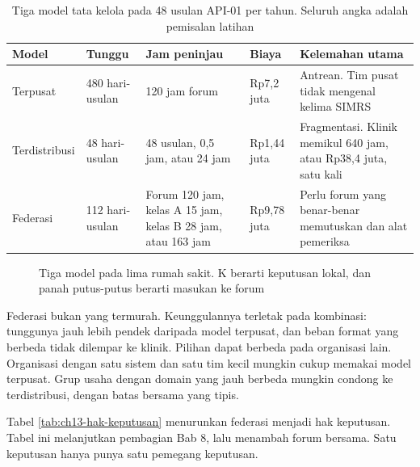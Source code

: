 \begin{table}[!htb]
  \centering
  \caption{Tiga model tata kelola pada 48 usulan API-01 per tahun. Seluruh angka adalah pemisalan latihan}
  \label{tab:ch13-tiga-model}
  \footnotesize
  \begin{tabularx}{\textwidth}{H{2.0cm}H{1.6cm}H{2.5cm}H{1.5cm}G}
    \hline
    \textbf{Model} & \textbf{Tunggu} & \textbf{Jam peninjau} & \textbf{Biaya} & \textbf{Kelemahan utama} \\ \hline
    Terpusat & 480 hari-usulan & 120 jam forum & Rp7,2 juta & Antrean. Tim pusat tidak mengenal kelima SIMRS \\ \hline
    Terdistribusi & 48 hari-usulan & 48 usulan, 0,5 jam, atau 24 jam & Rp1,44 juta & Fragmentasi. Klinik memikul 640 jam, atau Rp38,4 juta, satu kali \\ \hline
    Federasi & 112 hari-usulan & Forum 120 jam, kelas A 15 jam, kelas B 28 jam, atau 163 jam & Rp9,78 juta & Perlu forum yang benar-benar memutuskan dan alat pemeriksa \\ \hline
  \end{tabularx}
\end{table}

\begin{figure}[!htb]
  \centering
  \resizebox{\textwidth}{!}{}
  \caption{Tiga model pada lima rumah sakit. K berarti keputusan lokal, dan panah putus-putus berarti masukan ke forum}
  \label{fig:ch13-model-federasi}
\end{figure}

Federasi bukan yang termurah. Keunggulannya terletak pada kombinasi: tunggunya jauh lebih pendek daripada model terpusat, dan beban format
yang berbeda tidak dilempar ke klinik. Pilihan dapat berbeda pada organisasi lain. Organisasi dengan satu sistem dan satu tim kecil mungkin
cukup memakai model terpusat. Grup usaha dengan domain yang jauh berbeda mungkin condong ke terdistribusi, dengan batas bersama yang tipis.

Tabel \ref{tab:ch13-hak-keputusan} menurunkan federasi menjadi hak keputusan. Tabel ini melanjutkan pembagian Bab 8, lalu menambah forum
bersama. Satu keputusan hanya punya satu pemegang keputusan.

